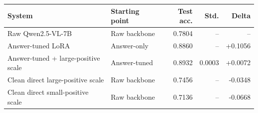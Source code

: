 \begin{tabular}{llrrr}
\toprule
System & Starting point & Test acc. & Std. & Delta \\
\midrule
Raw Qwen2.5-VL-7B & Raw backbone & 0.7804 & -- & -- \\
Answer-tuned LoRA & Answer-only & 0.8860 & -- & +0.1056 \\
Answer-tuned + large-positive scale & Answer-tuned & 0.8932 & 0.0003 & +0.0072 \\
Clean direct large-positive scale & Raw backbone & 0.7456 & -- & -0.0348 \\
Clean direct small-positive scale & Raw backbone & 0.7136 & -- & -0.0668 \\
\bottomrule
\end{tabular}
